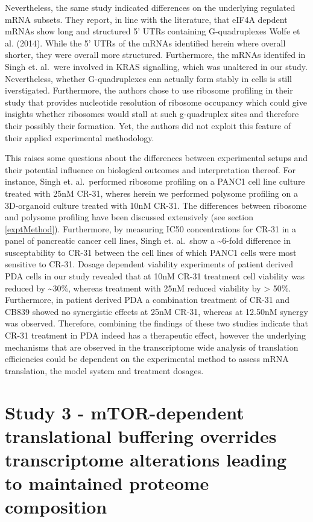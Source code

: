 \documentclass[
  12pt,
  openany]{book}
\begin{document}
Nevertheless, the same study indicated differences on the underlying regulated mRNA subsets. They report, in line with the literature, that eIF4A depdent mRNAs show long and structured 5' UTRs containing G-quadruplexes Wolfe et al. (2014). While the 5' UTRs of the mRNAs identified herein where overall shorter, they were overall more structured. Furthermore, the mRNAs identifed in Singh et. al.~were involved in KRAS signalling, which was unaltered in our study. Nevertheless, whether G-quadruplexes can actually form stably in cells is still iverstigated. Furthermore, the authors chose to use ribosome profiling in their study that provides nucleotide resolution of ribosome occupancy which could give insights whether ribosomes would stall at such g-quadruplex sites and therefore their possibly their formation. Yet, the authors did not exploit this feature of their applied experimental methodology.

This raises some questions about the differences between experimental setups and their potential influence on biological outcomes and interpretation thereof. For instance, Singh et. al.~performed ribosome profiling on a PANC1 cell line culture treated with 25nM CR-31, wheres herein we performed polysome profiling on a 3D-organoid culture treated with 10nM CR-31. The differences between ribosome and polysome profiling have been discussed extensively (see section \ref{exptMethod}). Furthermore, by measuring IC50 concentrations for CR-31 in a panel of pancreatic cancer cell lines, Singh et. al.~show a \textasciitilde6-fold difference in susceptability to CR-31 between the cell lines of which PANC1 cells were most sensitive to CR-31. Dosage dependent viability experiments of patient derived PDA cells in our study revealed that at 10nM CR-31 treatment cell viability was reduced by \textasciitilde30\%, whereas treatment with 25nM reduced viability by \textgreater{} 50\%. Furthermore, in patient derived PDA a combination treatment of CR-31 and CB839 showed no synergistic effects at 25nM CR-31, whereas at 12.50nM synergy was observed. Therefore, combining the findings of these two studies indicate that CR-31 treatment in PDA indeed has a therapeutic effect, however the underlying mechanisms that are observed in the transcriptome wide analysis of translation efficiencies could be dependent on the experimental method to assess mRNA translation, the model system and treatment dosages.

\section{Study 3 - mTOR-dependent translational buffering overrides transcriptome alterations leading to
maintained proteome composition}
\end{document}
